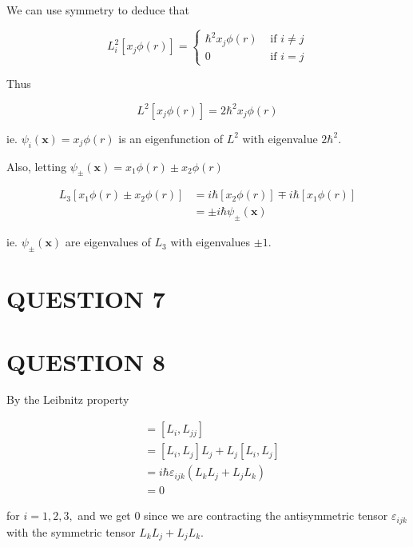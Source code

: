 \documentclass[a4paper]{article}
\begin{document}
We can use symmetry to deduce that

\[ L_{i}^{2}[ x_{j} \phi(r) ] = \begin{cases} \hbar^{2} x_{j} \phi(r)  & \text{ if } i \neq j \\ 0 &  \text{ if } i = j \end{cases}  \]

Thus

\[ L^{2}[ x_{j} \phi(r) ] = 2  \hbar^{2} x_{j} \phi(r) \]

ie. $ \psi_{i}(\mathbf{x}) = x_{j} \phi(r) $ is an eigenfunction of $ L^{2}  $ with eigenvalue $ 2\hbar^{2} $.

Also, letting $ \psi_{\pm}(\mathbf{x}) = x_{1} \phi(r) \pm  x_{2} \phi(r) $

\begin{align*}
L_{3} [ x_{1} \phi(r) \pm  x_{2} \phi(r) ] & = i \hbar [x_{2} \phi(r) ] \mp i \hbar [x_{1} \phi(r) ] \\
& = \pm i \hbar \psi_{\pm}(\mathbf{x})
\end{align*}

ie. $ \psi_{\pm}(\mathbf{x}) $ are eigenvalues of $ L_{3} $ with eigenvalues $ \pm 1 $.






                                                     
                                                                    
\section{QUESTION 7}

\section{QUESTION 8}

By the Leibnitz property

\begin{align*}
[L_{i},\mathbf{L}] & = [L_{i},L_{jj}]\\
& =  [L_{i},L_{j}] L_{j} + L_{j}[L_{i},L_{j}]  \\
& = i \hbar \varepsilon_{ijk} (L_{k}L_{j} + L_{j}L_{k}  ) \\
& = 0
\end{align*}

for $ i = 1,2,3, $ and we get 0 since we are contracting the antisymmetric tensor $ \varepsilon_{ijk} $ with the symmetric tensor $ L_{k}L_{j} + L_{j}L_{k} $.
\end{document}
